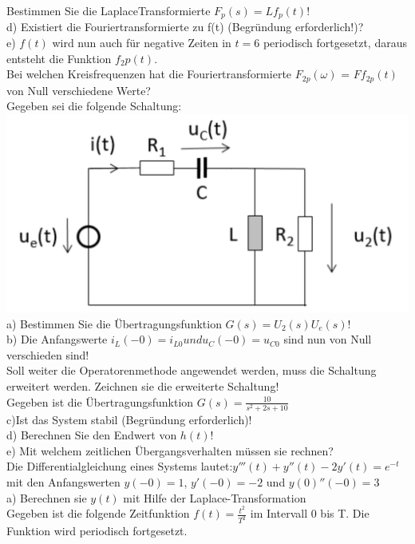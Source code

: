 \documentclass[A4]{scrartcl}
\begin{document}
  Bestimmen Sie die LaplaceTransformierte $F_p(s) = L{f_p(t)}$!\\
  d) Existiert die Fouriertransformierte zu f(t) (Begründung erforderlich!)?\\
  e) $f(t)$ wird nun auch für negative Zeiten in $t=6$ periodisch fortgesetzt, daraus entsteht die Funktion $f_2p(t)$.\\
  Bei welchen Kreisfrequenzen hat die Fouriertransformierte $F_{2p}(\omega)$ = $F{f_{2p}(t)}$ von Null verschiedene Werte?\\
  \newpage
  Gegeben sei die folgende Schaltung:\\
  \includegraphics{Schaltung2.png}\\
  a) Bestimmen Sie die Übertragungsfunktion $G(s) = U_2(s)U_e(s)$!\\
  b) Die Anfangswerte $i_L(-0)= i_{L0} und u_C(-0) = u_{C0}$ sind nun von Null verschieden sind!\\
  Soll weiter die Operatorenmethode angewendet werden, muss die Schaltung erweitert werden. Zeichnen sie die erweiterte Schaltung!\\
  Gegeben ist die Übertragungsfunktion $G(s)= \frac{10}{s^2+2s+10}$\\
  c)Ist das System stabil (Begründung erforderlich)!\\
  d) Berechnen Sie den Endwert von $h(t)$!\\
  e) Mit welchem zeitlichen Übergangsverhalten müssen sie rechnen?\\
  \newpage
  Die Differentialgleichung eines Systems lautet:$y'''(t) + y''(t) - 2y'(t) = e^{-t}$
  mit den Anfangswerten $y(-0) = 1$, $y'(-0) = -2$ und $y(0)''(-0) = 3$\\
  a) Berechnen sie $y(t)$ mit Hilfe der Laplace-Transformation\\
  \newpage
  Gegeben ist die folgende Zeitfunktion $f(t) =\frac{t^2}{T^2}$ im Intervall 0 bis T. Die Funktion wird periodisch fortgesetzt.\\
\end{document}

